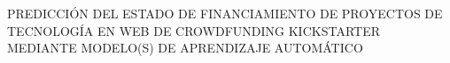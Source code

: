 \begin{center}
	\vspace*{10cm}
	{PREDICCIÓN DEL ESTADO DE FINANCIAMIENTO DE PROYECTOS DE TECNOLOGÍA EN WEB DE CROWDFUNDING KICKSTARTER MEDIANTE MODELO(S) DE APRENDIZAJE AUTOMÁTICO}
\end{center}
